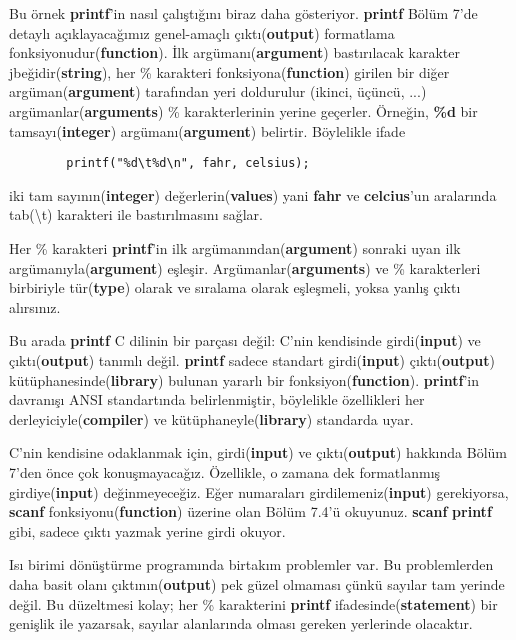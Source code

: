 \documentclass[a4paper,12pt,oneside]{book}
\begin{document}
\par Bu örnek \textbf{printf}'in nasıl çalıştığını biraz daha gösteriyor. \textbf{printf} Bölüm 7'de detaylı açıklayacağımız genel-amaçlı çıktı(\textbf{output}) formatlama fonksiyonudur(\textbf{function}). İlk argümanı(\textbf{argument}) bastırılacak karakter jbeğidir(\textbf{string}), her \% karakteri fonksiyona(\textbf{function}) girilen bir diğer argüman(\textbf{argument}) tarafından yeri doldurulur (ikinci, üçüncü, ...) argümanlar(\textbf{arguments}) \% karakterlerinin yerine geçerler. Örneğin, \textbf{\%d} bir tamsayı(\textbf{integer}) argümanı(\textbf{argument}) belirtir. Böylelikle ifade
\begin{lstlisting}
        printf("%d\t%d\n", fahr, celsius);
\end{lstlisting}
iki tam sayının(\textbf{integer}) değerlerin(\textbf{values}) yani \textbf{fahr} ve \textbf{celcius}'un aralarında tab(\textbackslash t) karakteri ile bastırılmasını sağlar.
\par Her \% karakteri \textbf{printf}'in ilk argümanından(\textbf{argument}) sonraki uyan ilk argümanıyla(\textbf{argument}) eşleşir. Argümanlar(\textbf{arguments}) ve \% karakterleri birbiriyle tür(\textbf{type}) olarak ve sıralama olarak eşleşmeli, yoksa yanlış çıktı alırsınız.
\par Bu arada \textbf{printf} C dilinin bir parçası değil: C'nin kendisinde girdi(\textbf{input}) ve çıktı(\textbf{output}) tanımlı değil. \textbf{printf} sadece standart girdi(\textbf{input}) çıktı(\textbf{output}) kütüphanesinde(\textbf{library}) bulunan yararlı bir fonksiyon(\textbf{function}). \textbf{printf}'in davranışı ANSI standartında belirlenmiştir, böylelikle özellikleri her derleyiciyle(\textbf{compiler}) ve kütüphaneyle(\textbf{library}) standarda uyar.
\par C'nin kendisine odaklanmak için, girdi(\textbf{input}) ve çıktı(\textbf{output}) hakkında Bölüm 7'den önce çok konuşmayacağız. Özellikle, o zamana dek formatlanmış girdiye(\textbf{input}) değinmeyeceğiz. Eğer numaraları girdilemeniz(\textbf{input}) gerekiyorsa, \textbf{scanf} fonksiyonu(\textbf{function}) üzerine olan Bölüm 7.4'ü okuyunuz. \textbf{scanf} \textbf{printf} gibi, sadece çıktı yazmak yerine girdi okuyor. \pagebreak
\par Isı birimi dönüştürme programında birtakım problemler var. Bu problemlerden daha basit olanı çıktının(\textbf{output}) pek güzel olmaması çünkü sayılar tam yerinde değil. Bu düzeltmesi kolay; her \% karakterini \textbf{printf} ifadesinde(\textbf{statement}) bir genişlik ile yazarsak, sayılar alanlarında olması gereken yerlerinde olacaktır.
\end{document}
